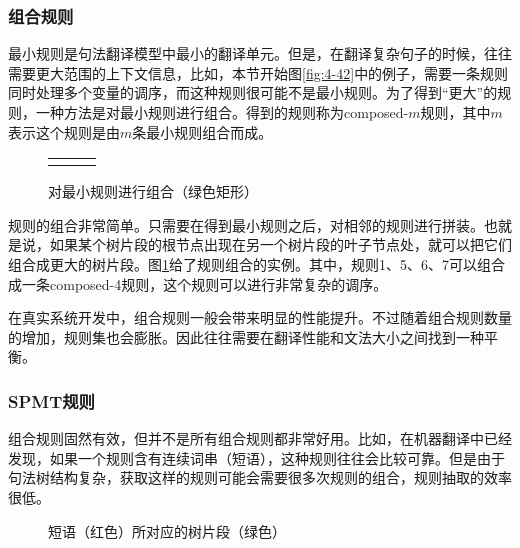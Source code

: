 \subsubsection{组合规则}

\parinterval 最小规则是句法翻译模型中最小的翻译单元。但是，在翻译复杂句子的时候，往往需要更大范围的上下文信息，比如，本节开始图\ref{fig:4-42}中的例子，需要一条规则同时处理多个变量的调序，而这种规则很可能不是最小规则。为了得到``更大''的规则，一种方法是对最小规则进行组合。得到的规则称为composed-$m$规则，其中$m$表示这个规则是由$m$条最小规则组合而成。

\begin{figure}[htp]
\centering
\begin{tabular}{l l l}
& \subfigure{} &  \subfigure{}
\end{tabular}
\caption{对最小规则进行组合（绿色矩形）}
\label{fig:4-56}
\end{figure}

\parinterval 规则的组合非常简单。只需要在得到最小规则之后，对相邻的规则进行拼装。也就是说，如果某个树片段的根节点出现在另一个树片段的叶子节点处，就可以把它们组合成更大的树片段。图\ref{fig:4-56}给了规则组合的实例。其中，规则1、5、6、7可以组合成一条composed-4规则，这个规则可以进行非常复杂的调序。

\parinterval 在真实系统开发中，组合规则一般会带来明显的性能提升。不过随着组合规则数量的增加，规则集也会膨胀。因此往往需要在翻译性能和文法大小之间找到一种平衡。


\subsubsection{SPMT规则}

\parinterval 组合规则固然有效，但并不是所有组合规则都非常好用。比如，在机器翻译中已经发现，如果一个规则含有连续词串（短语），这种规则往往会比较可靠。但是由于句法树结构复杂，获取这样的规则可能会需要很多次规则的组合，规则抽取的效率很低。

\begin{figure}[htp]
\centering

\caption{短语（红色）所对应的树片段（绿色）}
\label{fig:4-57}
\end{figure}

